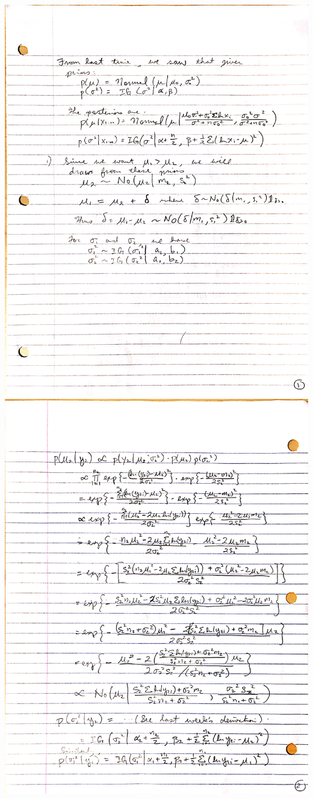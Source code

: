 \documentclass{article}
\begin{document}
\begin{enumerate}
\includegraphics[scale=0.23]{page1.jpg} \\
\includegraphics[scale=0.23]{page2.jpg} \\

\end{enumerate}
\end{document}
